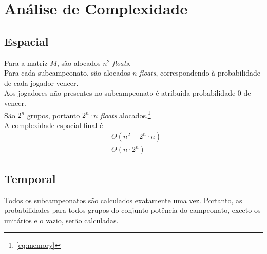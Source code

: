 \documentclass{article}
\begin{document}
\section{Análise de Complexidade}

\subsection{Espacial}
\noindent Para a matriz $M$, são alocados $n^2$ \textit{floats}.\\[5pt]
Para cada subcampeonato, são alocados $n$ \textit{floats}, correspondendo à probabilidade de cada jogador vencer.\\
Aos jogadores não presentes no subcampeonato é atribuida probabilidade $0$ de vencer. \\[5pt]
São $2^n$ grupos, portanto $2^n \cdot n$ \textit{floats} alocados.\footnote{\autoref{eq:memory}} \\[5pt]
A complexidade espacial final é
\begin{align*}
  & \Theta \left( n^2 + 2^n \cdot n \right) \\
  & \Theta \left(n \cdot 2^n \right)
\end{align*}

\subsection{Temporal}
\noindent Todos os subcampeonatos são calculados exatamente uma vez. Portanto, as probabilidades para todos grupos do conjunto potência do campeonato, exceto os unitários e o vazio, serão calculadas.
\end{document}
